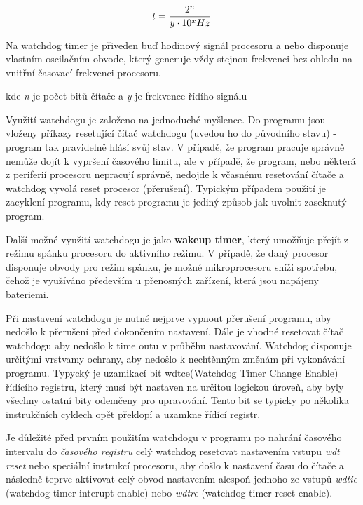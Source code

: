 $$ t = {2^n\over y \cdot 10^x Hz }$$

Na watchdog timer je přiveden buď hodinový signál procesoru a nebo disponuje vlastním oscilačním obvode, který generuje vždy stejnou frekvenci bez ohledu na vnitřní časovací frekvenci procesoru.

kde {\it n} je počet bitů čítače a {\it y} je frekvence řídího signálu 


Využití watchdogu je založeno na jednoduché myšlence. Do programu jsou vloženy příkazy resetující čítač watchdogu (uvedou ho do původního stavu) - program tak pravidelně hlásí svůj stav. V případě, že program pracuje správně nemůže dojít k vypršení časového limitu, ale v případě, že program, nebo některá z periferií procesoru nepracují správně, nedojde k včasnému resetování čítače a watchdog vyvolá reset procesor (přerušení). Typickým případem použití je zacyklení programu, kdy reset programu je jediný způsob jak uvolnit zaseknutý program.  

Další možné využití watchdogu je jako {\bf wakeup timer}, který umožňuje přejít z režimu spánku procesoru do aktivního režimu. V případě, že daný procesor disponuje obvody pro režim spánku, je možné mikroprocesoru sníži spotřebu, čehož je využíváno především u přenosných zařízení, která jsou napájeny bateriemi. 


Při nastavení watchdogu je nutné nejprve vypnout přerušení programu, aby nedošlo k přerušení před dokončením nastavení. Dále je vhodné resetovat čítač watchdogu aby nedošlo k time outu v průběhu nastavování. Watchdog disponuje určitými vrstvamy ochrany, aby nedošlo k nechtěnným změnám při vykonávání programu. Typycký je uzamikací bit wdtce(Watchdog Timer Change Enable) řídícího registru, který musí být nastaven na určitou logickou úroveň, aby byly všechny ostatní bity odemčeny pro upravování. Tento bit se typicky po několika instrukčních cyklech opět překlopí a uzamkne řídící registr.

Je důležité před prvním použitím watchdogu v programu po nahrání časového intervalu do {\it časového registru} celý watchdog resetovat nastavením vstupu {\it wdt reset} nebo speciální instrukcí procesoru, aby došlo k nastavení času do čítače a následně teprve aktivovat celý obvod nastavením alespoň jednoho ze vstupů {\it wdtie} (watchdog timer interupt enable) nebo {\it wdtre} (watchdog timer reset enable).

